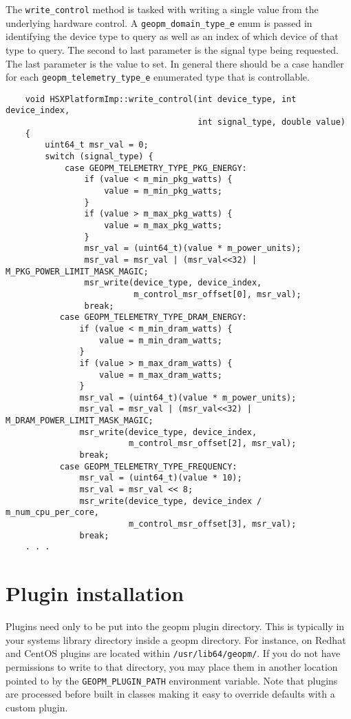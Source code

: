 \documentclass[11pt]{article}
\begin{document}
The \verb#write_control# method is tasked with writing a single value
from the underlying hardware control. A \verb#geopm_domain_type_e#
enum is passed in identifying the device type to query as well as an
index of which device of that type to query. The second to last
parameter is the signal type being requested. The last parameter is
the value to set. In general there should be a case handler for each
\verb#geopm_telemetry_type_e# enumerated type that is controllable.
\begin{verbatim}
    void HSXPlatformImp::write_control(int device_type, int device_index,
                                       int signal_type, double value)
    {
        uint64_t msr_val = 0;
        switch (signal_type) {
            case GEOPM_TELEMETRY_TYPE_PKG_ENERGY:
                if (value < m_min_pkg_watts) {
                    value = m_min_pkg_watts;
                }
                if (value > m_max_pkg_watts) {
                    value = m_max_pkg_watts;
                }
                msr_val = (uint64_t)(value * m_power_units);
                msr_val = msr_val | (msr_val<<32) | M_PKG_POWER_LIMIT_MASK_MAGIC;
                msr_write(device_type, device_index,
                          m_control_msr_offset[0], msr_val);
                break;
           case GEOPM_TELEMETRY_TYPE_DRAM_ENERGY:
               if (value < m_min_dram_watts) {
                   value = m_min_dram_watts;
               }
               if (value > m_max_dram_watts) {
                   value = m_max_dram_watts;
               }
               msr_val = (uint64_t)(value * m_power_units);
               msr_val = msr_val | (msr_val<<32) | M_DRAM_POWER_LIMIT_MASK_MAGIC;
               msr_write(device_type, device_index,
                         m_control_msr_offset[2], msr_val);
               break;
           case GEOPM_TELEMETRY_TYPE_FREQUENCY:
               msr_val = (uint64_t)(value * 10);
               msr_val = msr_val << 8;
               msr_write(device_type, device_index / m_num_cpu_per_core,
                         m_control_msr_offset[3], msr_val);
               break;
    . . .
\end{verbatim}

\section{Plugin installation}
Plugins need only to be put into the geopm plugin directory. This is
typically in your systems library directory inside a geopm
directory. For instance, on Redhat and CentOS plugins are located
within \verb#/usr/lib64/geopm/#. If you do not have permissions to
write to that directory, you may place them in another location
pointed to by the \verb#GEOPM_PLUGIN_PATH# environment variable.  Note
that plugins are processed before built in classes making it easy to
override defaults with a custom plugin.
\end{document}
